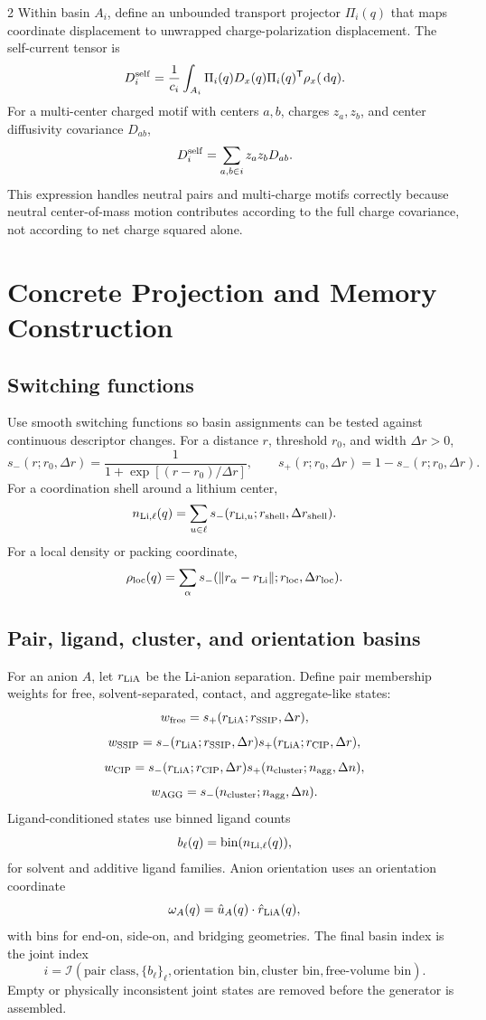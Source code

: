 \documentclass[10pt]{article}
\newcommand{\dd}{\,\mathrm d}
\newcommand{\T}{\mathsf{T}}
\begin{document}
\begin{multicols}{2}
Within basin \(A_i\), define an unbounded transport projector \(\Pi_i(q)\) that
maps coordinate displacement to unwrapped charge-polarization displacement. The
self-current tensor is
\[
D_i^{\rm self}
=
\frac{1}{c_i}
\int_{A_i}
\Pi_i(q)D_x(q)\Pi_i(q)^\T
\rho_x(\dd q).
\]
For a multi-center charged motif with centers \(a,b\), charges \(z_a,z_b\), and
center diffusivity covariance \(D_{ab}\),
\[
D_i^{\rm self}
=
\sum_{a,b\in i}z_az_bD_{ab}.
\]
This expression handles neutral pairs and multi-charge motifs correctly because
neutral center-of-mass motion contributes according to the full charge covariance,
not according to net charge squared alone.

\section{Concrete Projection and Memory Construction}
\label{sec:concreteprojection}

\subsection{Switching functions}

Use smooth switching functions so basin assignments can be tested against
continuous descriptor changes. For a distance \(r\), threshold \(r_0\), and
width \(\Delta r>0\),
\[
s_-(r;r_0,\Delta r)=
\frac{1}{1+\exp[(r-r_0)/\Delta r]},
\qquad
s_+(r;r_0,\Delta r)=1-s_-(r;r_0,\Delta r).
\]
For a coordination shell around a lithium center,
\[
n_{\rm Li,\ell}(q)
=
\sum_{u\in\ell}s_-(r_{{\rm Li},u};r_{\rm shell},\Delta r_{\rm shell}).
\]
For a local density or packing coordinate,
\[
\rho_{\rm loc}(q)
=
\sum_{\alpha}
s_-(\|r_\alpha-r_{\rm Li}\|;r_{\rm loc},\Delta r_{\rm loc}).
\]

\subsection{Pair, ligand, cluster, and orientation basins}

For an anion \(A\), let \(r_{\rm LiA}\) be the Li-anion separation. Define pair
membership weights for free, solvent-separated, contact, and aggregate-like
states:
\[
w_{\rm free}=s_+(r_{\rm LiA};r_{\rm SSIP},\Delta r),
\]
\[
w_{\rm SSIP}=s_-(r_{\rm LiA};r_{\rm SSIP},\Delta r)
s_+(r_{\rm LiA};r_{\rm CIP},\Delta r),
\]
\[
w_{\rm CIP}=s_-(r_{\rm LiA};r_{\rm CIP},\Delta r)
s_+(n_{\rm cluster};n_{\rm agg},\Delta n),
\]
\[
w_{\rm AGG}=s_-(n_{\rm cluster};n_{\rm agg},\Delta n).
\]
Ligand-conditioned states use binned ligand counts
\[
b_\ell(q)=\operatorname{bin}(n_{\rm Li,\ell}(q)),
\]
for solvent and additive ligand families. Anion orientation uses an orientation
coordinate
\[
\omega_A(q)=\hat u_A(q)\cdot\hat r_{\rm LiA}(q),
\]
with bins for end-on, side-on, and bridging geometries. The final basin index is
the joint index
\[
i=
\mathcal I\!\left(
\text{pair class},
\{b_\ell\}_{\ell},
\text{orientation bin},
\text{cluster bin},
\text{free-volume bin}
\right).
\]
Empty or physically inconsistent joint states are removed before the generator
is assembled.


\end{multicols}
\end{document}
